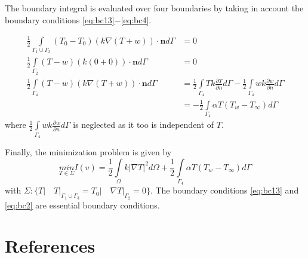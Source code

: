 \documentclass[10pt,a4paper]{article}
\begin{document}
The boundary integral is evaluated over four boundaries by taking in account the boundary conditions \eqref{eq:bc13}$-$\eqref{eq:bc4}. 

\begin{align}\label{eq:bcint13}
	\frac{1}{2}\underset{\Gamma_1\cup\Gamma_3}{\int}(T_0-T_0)(k\nabla(T+w))\cdot\textbf{\^{n}} d\Gamma &= 0\\
	\frac{1}{2}\underset{\Gamma_2}{\int}(T-w)(k(0+0))\cdot\textbf{\^{n}} d\Gamma & = 0\label{eq:bcint2}\\ 
	\frac{1}{2}\underset{\Gamma_4}{\int}(T-w)(k\nabla(T+w))\cdot\textbf{\^{n}} d\Gamma & = \frac{1}{2}\underset{\Gamma_4}{\int}Tk\frac{\partial T}{\partial n}d\Gamma - \frac{1}{2}\underset{\Gamma_4}{\int}wk\frac{\partial w}{\partial n}d\Gamma\nonumber\\
	&=-\frac{1}{2}\underset{\Gamma_4}{\int}\alpha T(T_w-T_{\infty})d\Gamma \label{eq:bcint4}
\end{align}
where $\frac{1}{2}\underset{\Gamma_4}{\int}wk\frac{\partial w}{\partial n}d\Gamma$ is neglected as it too is independent of $T$.

Finally, the minimization problem is given by
\begin{equation}\label{eq:minf}
\underset{T\in\Sigma} {min}I(v) =\frac{1}{2}\underset{\Omega}{\int}k\lvert\nabla T \rvert ^{2}  d\Omega + \frac{1}{2}\underset{\Gamma_4}{\int}\alpha T(T_w-T_{\infty})d\Gamma 
\end{equation}
with $\Sigma: \{T\rvert\quad T\rvert_{\Gamma_1\cup\Gamma_3}=T_0\rvert\quad \nabla T\rvert_{\Gamma_2}=0\}$. The boundary conditions \eqref{eq:bc13} and \eqref{eq:bc2} are essential boundary conditions.
\section{References}
\end{document}
